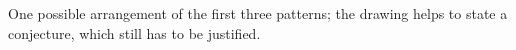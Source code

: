 \par\medskip\noindent\begin{minipage}{\linewidth}\centering
{}
\par\medskip One possible arrangement of the first three patterns; the drawing helps to state a conjecture, which still has to be justified.\end{minipage}\par\medskip

